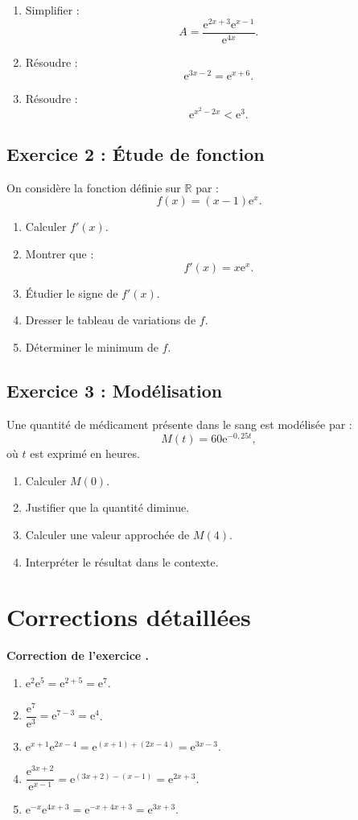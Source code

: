 \documentclass[11pt,a4paper]{article}
\newcounter{corr}
\newenvironment{correction}[1][]{
\refstepcounter{corr}
\par\medskip
\noindent\textbf{\textcolor{vert}{Correction de l'exercice \thecorr.}} \textit{#1}
\par\smallskip
}{\medskip}
\newcommand{\R}{\mathbb{R}}
\newcommand{\e}{\mathrm{e}}
\begin{document}
\begin{enumerate}
    \item Simplifier :
    \[
    A=\frac{\e^{2x+3}\e^{x-1}}{\e^{4x}}.
    \]
    \item Résoudre :
    \[
    \e^{3x-2}=\e^{x+6}.
    \]
    \item Résoudre :
    \[
    \e^{x^2-2x}<\e^3.
    \]
\end{enumerate}

\subsection*{Exercice 2 : Étude de fonction}

On considère la fonction définie sur $\R$ par :
\[
f(x)=(x-1)\e^x.
\]

\begin{enumerate}
    \item Calculer $f'(x)$.
    \item Montrer que :
    \[
    f'(x)=x\e^x.
    \]
    \item Étudier le signe de $f'(x)$.
    \item Dresser le tableau de variations de $f$.
    \item Déterminer le minimum de $f$.
\end{enumerate}

\subsection*{Exercice 3 : Modélisation}

Une quantité de médicament présente dans le sang est modélisée par :
\[
M(t)=60\e^{-0,25t},
\]
où $t$ est exprimé en heures.

\begin{enumerate}
    \item Calculer $M(0)$.
    \item Justifier que la quantité diminue.
    \item Calculer une valeur approchée de $M(4)$.
    \item Interpréter le résultat dans le contexte.
\end{enumerate}

\section{Corrections détaillées}

\begin{correction}
\begin{enumerate}[label=\alph*)]
    \item $\e^2\e^5=\e^{2+5}=\e^7$.
    \item $\dfrac{\e^7}{\e^3}=\e^{7-3}=\e^4$.
    \item $\e^{x+1}\e^{2x-4}=\e^{(x+1)+(2x-4)}=\e^{3x-3}$.
    \item $\dfrac{\e^{3x+2}}{\e^{x-1}}=\e^{(3x+2)-(x-1)}=\e^{2x+3}$.
    \item $\e^{-x}\e^{4x+3}=\e^{-x+4x+3}=\e^{3x+3}$.
\end{enumerate}
\end{correction}
\end{document}
